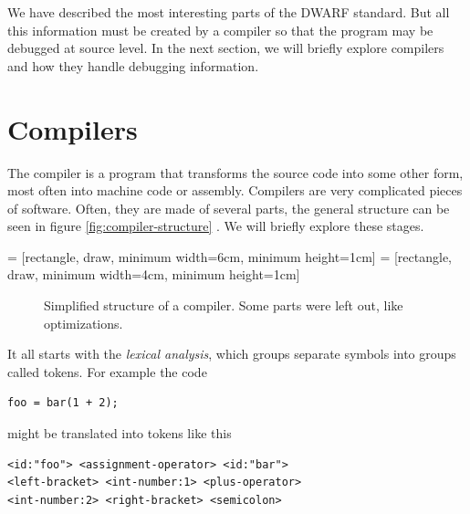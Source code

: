 We have described the most interesting parts of the DWARF standard. But all
this information must be created by a compiler so that the program
may be debugged at source level. In the next section, we will briefly explore
compilers and how they handle debugging information.

\section{Compilers}
The compiler is a program that transforms the source code into some other form,
most often into machine code or assembly. Compilers are very complicated pieces
of software. Often, they are made of several parts, the general structure can
be seen in figure \ref{fig:compiler-structure} \cite{dragon-book}. We will
briefly explore these stages.

 = [rectangle, draw, minimum width=6cm, minimum height=1cm] 
 = [rectangle, draw, minimum width=4cm, minimum height=1cm] 
\begin{figure}\label{fig:compiler-structure}
    {\centering
    \par}
    \caption{Simplified structure of a compiler. Some parts were left out, like
    optimizations.}
    \label{fig:compiler_tikz}
\end{figure}

It all starts with the \textit{lexical analysis}, which groups separate symbols
into groups called tokens. For example the code
\begin{verbatim}
foo = bar(1 + 2);
\end{verbatim}
might be translated into tokens like this
\begin{lstlisting}[stringstyle=\color{black}]
<id:"foo"> <assignment-operator> <id:"bar"> 
<left-bracket> <int-number:1> <plus-operator> 
<int-number:2> <right-bracket> <semicolon>
\end{lstlisting}


